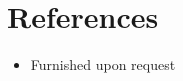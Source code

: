 \documentclass[letterpaper,11pt]{article}
\makeatletter
\newcommand{\resumeOrganizationHeading}[4]{
  \vspace{-2pt}\item
    \begin{tabular*}{0.97\textwidth}[t]{l@{\extracolsep{\fill}}r}
      \textbf{#1} & \textit{\small #2} \\
      \textit{\small#3}
    \end{tabular*}\vspace{-7pt}
}
\newcommand{\resumeSubHeadingListStart}{\begin{itemize}[leftmargin=0.15in, label={}]}
\newcommand{\resumeSubHeadingListEnd}{\end{itemize}}
\makeatother
\begin{document}




    
    




    
    








\section{References}
  \resumeSubHeadingListStart
  	\item {Furnished upon request}
  \resumeSubHeadingListEnd



\end{document}
